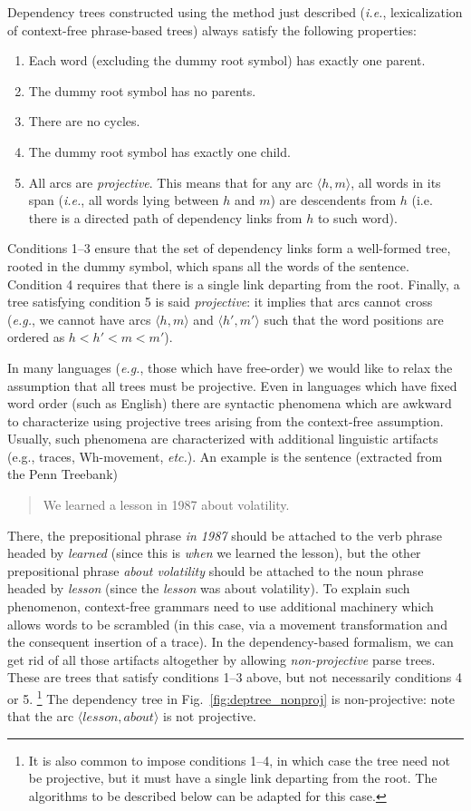 Dependency trees constructed using the method just described (\emph{i.e.}, lexicalization of context-free phrase-based trees) always satisfy the following properties: 
\begin{enumerate}
\item Each word (excluding the dummy root symbol) has exactly one parent. 
\item The dummy root symbol has no parents.
\item There are no cycles. 
\item The dummy root symbol has exactly one child. 
\item All arcs are \emph{projective}. This means that for any arc $\langle h,m \rangle$, all words in its span (\emph{i.e.}, all words lying between $h$ and $m$) 
are descendents from $h$ (i.e. there is a directed path of dependency links from $h$ to such word). 
\end{enumerate}

Conditions 1--3 ensure that the set of dependency links form a well-formed tree, rooted in the dummy symbol, which spans all the words of the sentence. 
Condition 4 requires that there is a single link departing from the root. 
Finally, a tree satisfying condition 5 is said \emph{projective}: it implies that arcs cannot cross (\emph{e.g.}, we cannot have arcs $\langle h,m \rangle$ and $\langle h',m' \rangle$ 
such that the word positions are ordered as $h < h' < m < m'$). 

In many languages (\emph{e.g.}, those which have free-order) we would like to relax the assumption that all trees must be projective. Even in languages which have fixed word order 
(such as English) there are syntactic phenomena which are awkward to characterize using projective trees arising from the context-free assumption. Usually, 
such phenomena are characterized with additional linguistic artifacts (e.g., traces, Wh-movement, \emph{etc.}). 
An example is the sentence (extracted from the Penn Treebank)
\begin{quote}
We learned a lesson in 1987 about volatility. 
\end{quote}
There, the prepositional phrase \emph{in 1987} should be attached to the verb phrase headed by \emph{learned} (since this is \emph{when} we learned the lesson), 
but the other prepositional phrase \emph{about volatility} should be attached to the noun phrase headed by \emph{lesson} (since the \emph{lesson} was about volatility). 
To explain such phenomenon, 
context-free grammars need to use additional machinery which allows words to be scrambled (in this case, via a movement transformation and the consequent insertion of a trace).
In the dependency-based formalism, we can get rid of all those artifacts altogether by allowing \emph{non-projective} parse trees. 
These are trees that satisfy conditions 1--3 above, but not necessarily conditions 4 or 5.%
\footnote{It is also common to impose conditions 1--4, in which case the tree need not be projective, but it must have a 
single link departing from the root. The algorithms to be described below can be adapted for this case.} 
The dependency tree in Fig.~\ref{fig:deptree_nonproj} is non-projective: note that the arc $\langle lesson, about \rangle$ is not projective. 

